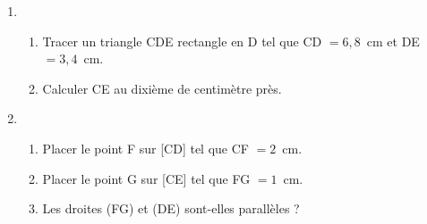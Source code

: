 
\medskip

\begin{enumerate}
\item 
	\begin{enumerate}
		\item Tracer un triangle CDE rectangle en D tel que CD $= 6,8$~cm et DE $= 3,4$~cm.
		\item Calculer CE au dixième de centimètre près.
 	\end{enumerate}
\item 
	\begin{enumerate}
		\item Placer le point F sur [CD] tel que CF $= 2$~cm.
		\item Placer le point G sur [CE] tel que FG $= 1$~cm.
		\item Les droites (FG) et (DE) sont-elles parallèles ?
	\end{enumerate}
\end{enumerate}

\bigskip

